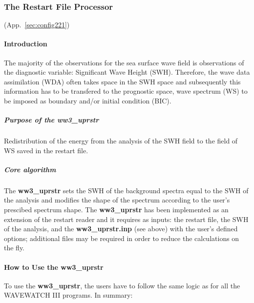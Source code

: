 \vsssub
\subsubsection{The Restart File Processor} \label{sec:ww3uprstr}
\vsssub

 (App.~\ref{sec:config221})

\vspace{\baselineskip} 

\paragraph{Introduction \newline } 

The majority of the observations for the sea surface wave field is 
observations of the diagnostic variable: Significant Wave Height (SWH). 
Therefore, the wave data assimilation (WDA) often takes space in the SWH 
space and subsequently this information has to be transfered to the 
prognostic space, wave spectrum (WS) to be imposed as boundary and/or 
initial condition (BIC). 

\subparagraph{Purpose of the \textbf{ww3\_uprstr}  \newline } Redistribution of 
the energy from the analysis of the SWH field to the field of WS saved
in the restart file. 

\subparagraph{Core algorithm \newline } 
The \textbf{ww3\_uprstr} sets the SWH of the background spectra equal to 
the SWH of the analysis and modifies the shape of the spectrum according 
to the user's prescibed spectrum shape. The \textbf{ww3\_uprstr} has been  
implemented as an extension of the restart reader and it requires as inputs: 
the restart file, the SWH of the analysis, and the \textbf{ww3\_uprstr.inp} 
(see above) with the user's defined options; additional files may be
required in order to reduce the calculations on the fly.

\paragraph{How to Use the ww3\_uprstr \newline}
To use the \textbf{ww3\_uprstr}, the users have to follow the same logic 
as for all the WAVEWATCH III programs. In summary: 

